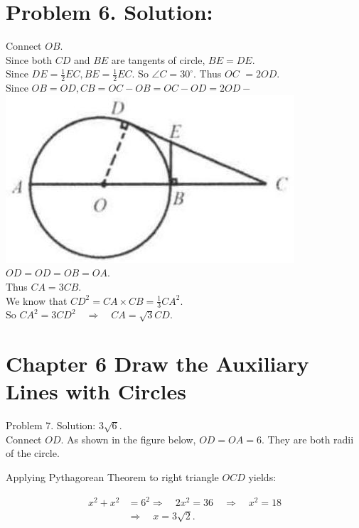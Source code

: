 \documentclass[10pt]{article}
\begin{document}
\section*{Problem 6. Solution:}
Connect \(O B\).\\
Since both \(C D\) and \(B E\) are tangents of circle, \(B E=D E\).\\
Since \(D E=\frac{1}{2} E C, B E=\frac{1}{2} E C\). So \(\angle C=30^{\circ}\). Thus \(O C\) \(=2 O D\).\\
Since \(O B=O D, C B=O C-O B=O C-O D=2 O D-\)\\
\includegraphics[max width=\textwidth, center]{2025_04_17_97bc1f7e44d93c271a88g-158(2)}\\
\(O D=O D=O B=O A\).\\
Thus \(C A=3 C B\).\\
We know that \(C D^{2}=C A \times C B=\frac{1}{3} C A^{2}\).\\
So \(C A^{2}=3 C D^{2} \quad \Rightarrow \quad C A=\sqrt{3} C D\).

\section*{Chapter 6 Draw the Auxiliary Lines with Circles}
Problem 7. Solution: \(3 \sqrt{6}\).\\
Connect \(O D\). As shown in the figure below, \(O D=O A=6\). They are both radii of the circle.

Applying Pythagorean Theorem to right triangle \(O C D\) yields:

\[
\begin{aligned}
x^{2}+x^{2} & =6^{2} \Rightarrow \quad 2 x^{2}=36 \quad \Rightarrow \quad x^{2}=18 \\
& \Rightarrow \quad x=3 \sqrt{2} .
\end{aligned}
\]
\end{document}
